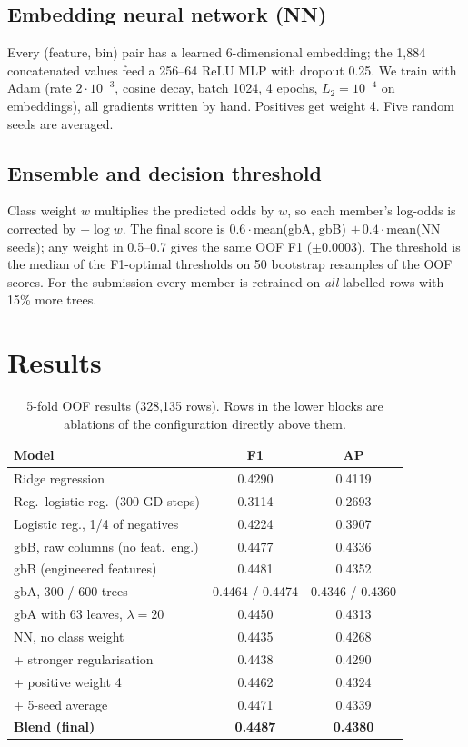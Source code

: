 \documentclass[10pt,conference,compsocconf]{IEEEtran}
\begin{document}
\subsection{Embedding neural network (NN)}
Every (feature, bin) pair has a learned 6-dimensional embedding; the 1,884 concatenated
values feed a 256--64 ReLU MLP with dropout 0.25. We train with Adam (rate $2\cdot10^{-3}$,
cosine decay, batch 1024, 4 epochs, $L_2=10^{-4}$ on embeddings), all gradients written by
hand. Positives get weight 4. Five random seeds are averaged.

\subsection{Ensemble and decision threshold}
Class weight $w$ multiplies the predicted odds by $w$, so each member's log-odds is
corrected by $-\log w$. The final score is $0.6\cdot$mean(gbA, gbB) $+\,0.4\cdot$mean(NN
seeds); any weight in 0.5--0.7 gives the same OOF F1 ($\pm0.0003$). The threshold is the
median of the F1-optimal thresholds on 50 bootstrap resamples of the OOF scores. For the
submission every member is retrained on \emph{all} labelled rows with 15\% more trees.

\section{Results}
\begin{table}[t]
\centering\caption{5-fold OOF results (328,135 rows). Rows in the lower blocks are ablations
of the configuration directly above them.}\label{tab:res}
\footnotesize\setlength{\tabcolsep}{4pt}
\begin{tabular}{lcc}
\toprule
Model & F1 & AP\\
\midrule
Ridge regression & 0.4290 & 0.4119\\
Reg.\ logistic reg.\ (300 GD steps) & 0.3114 & 0.2693\\
Logistic reg., 1/4 of negatives & 0.4224 & 0.3907\\
\midrule
gbB, raw columns (no feat.\ eng.) & 0.4477 & 0.4336\\
gbB (engineered features) & 0.4481 & 0.4352\\
gbA, 300 / 600 trees & 0.4464 / 0.4474 & 0.4346 / 0.4360\\
gbA with 63 leaves, $\lambda=20$ & 0.4450 & 0.4313\\
\midrule
NN, no class weight & 0.4435 & 0.4268\\
\quad + stronger regularisation & 0.4438 & 0.4290\\
\quad + positive weight 4 & 0.4462 & 0.4324\\
\quad + 5-seed average & 0.4471 & 0.4339\\
\midrule
\textbf{Blend (final)} & \textbf{0.4487} & \textbf{0.4380}\\
\bottomrule
\end{tabular}
\end{table}
\end{document}
